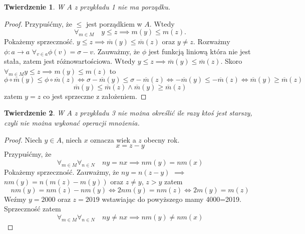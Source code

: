 \documentclass[12pt,a4paper]{report}
\newtheorem{tw}{Twierdzenie}
\begin{document}
\begin{tw}
W $A$ z przykładu 1 nie ma porządku.
\end{tw}
\begin{proof}
Przypuśćmy, że $\le$ jest porządkiem w $A$. Wtedy
\begin{equation*}
\forall_{m\in M} \quad y \le z \implies m(y) \le m(z).
\end{equation*}
Pokażemy sprzeczność. $y\le z \implies \overline{m}(y)\le \overline{m}(z)$ oraz $y\ne z$. Rozważmy $\phi :a \to a$ $\forall_{v \in a} \phi(v) = \sigma -v$. Zauważmy, że $\phi$ jest funkcją liniową która nie jest stała, zatem jest różnowartościowa. Wtedy $y \le z \implies \overline{m}(y) \le \overline{m}(z)$. Skoro $\forall_{m \in M} y\le z \implies m(y) \le m(z)$ to 
\begin{equation*}
\phi \circ \overline{m}(y) \le \phi \circ \overline{m}(z) \iff \sigma -\overline{m}(y) \le \sigma - \overline{m}(z)\iff -\overline{m}(y) \le -\overline{m}(z) \iff \overline{m}(y) \ge \overline{m}(z)
\end{equation*}
\begin{equation*}
\overline{m}(y) \le \overline{m}(z) \land \overline{m}(y) \ge \overline{m}(z)
\end{equation*}
zatem $y=z$ co jest sprzeczne z założeniem.

\end{proof}
\begin{tw}
W $A$ z przykładu 3 nie można określić ile razy ktoś jest starszy, czyli nie można wykonać operacji mnożenia.
\end{tw}
\begin{proof}
Niech $y \in A$, niech $x$ oznacza wiek a $z$ obecny rok.
\begin{equation*}
x=z-y
\end{equation*}
Przypuśćmy, że 
\begin{equation*}
\forall_{m \in M} \forall_{n \in N}\quad ny=nx \implies nm(y)=nm(x)
\end{equation*}
Pokażemy sprzeczność. Zauważmy, że $ny=n(z-y)$ $\implies$ $nm(y)=n(m(z)-m(y))$ oraz $z \ne y$, $z>y$ zatem
\begin{equation*}
nm(y)=nm(z)-nm(y) \iff 2nm(y)=nm(z) \iff 2m(y)=m(z)
\end{equation*}
Weźmy $y=2000$ oraz $z=2019$ wstawiając do powyższego mamy 4000=2019. Sprzeczność zatem
\begin{equation*}
\forall_{m \in M} \forall_{n \in N}\quad ny\ne nx \implies nm(y)\ne nm(x)
\end{equation*}
\end{proof}
\end{document}
